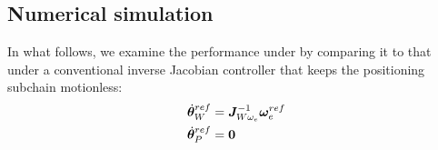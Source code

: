\subsection{Numerical simulation}
\label{sec:SIMULATION}
In what follows, we examine the performance under  by comparing it to
that under a conventional inverse Jacobian controller that keeps the positioning subchain motionless:
%
\begin{align}
  {\dot{\bm{\theta}}}_{W}^{ref} &= \bm{J}_{W\omega_{e}}^{-1}\bm{\omega}_{e}^{ref}\\
  {\dot{\bm{\theta}}}_{P}^{ref} &= \bm{0}
\end{align}
%

